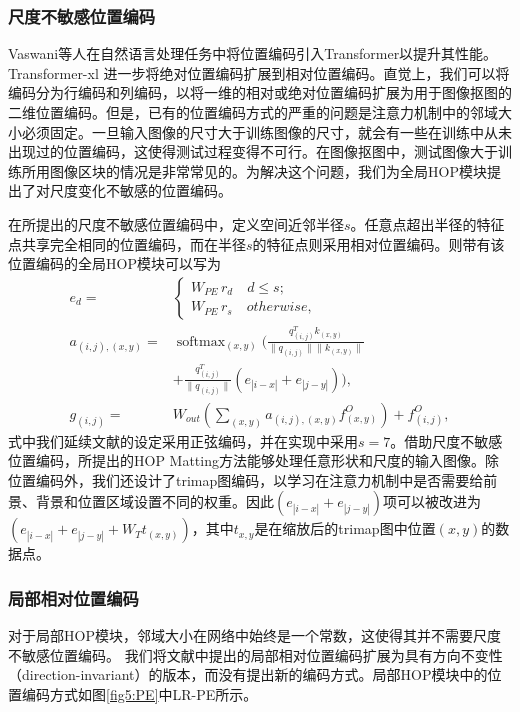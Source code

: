 \subsubsection{尺度不敏感位置编码}
Vaswani等人\cite{vaswani2017attention}在自然语言处理任务中将位置编码引入Transformer以提升其性能。Transformer-xl \cite{dai2019transformer} 进一步将绝对位置编码扩展到相对位置编码。直觉上，我们可以将编码分为行编码和列编码，以将一维的相对或绝对位置编码扩展为用于图像抠图的二维位置编码。但是，已有的位置编码方式的严重的问题是注意力机制中的邻域大小必须固定。一旦输入图像的尺寸大于训练图像的尺寸，就会有一些在训练中从未出现过的位置编码，这使得测试过程变得不可行。在图像抠图中，测试图像大于训练所用图像区块的情况是非常常见的。为解决这个问题，我们为全局HOP模块提出了对尺度变化不敏感的位置编码。

在所提出的尺度不敏感位置编码中，定义空间近邻半径$s$。任意点超出半径的特征点共享完全相同的位置编码，而在半径$s$的特征点则采用相对位置编码。则带有该位置编码的全局HOP模块可以写为
\begin{equation}
\begin{aligned}
e_d =& \begin{cases} W_{PE}\,r_d  \quad d\le s;\\ W_{PE}\,r_s   \quad otherwise,\end{cases} \\
a_{(i,j),(x,y)} =& \mathop{\mathrm{softmax}}_{(x,y)}(\frac{q_{(i,j)}^Tk_{(x,y)}}{\|q_{(i,j)}\|\|k_{(x,y)}\|}\\ & + \frac{q_{(i,j)}^T}{\|q_{(i,j)}\|}(e_{|i-x|}+e_{|j-y|})),\\
g_{(i,j)} =& W_{out}(\sum_{(x,y)}a_{(i,j),(x,y)}f^O_{(x,y)}) + f^O_{(i,j)},
\end{aligned}
\end{equation}
式中我们延续文献\parencite{vaswani2017attention,dai2019transformer}的设定采用正弦编码，并在实现中采用$s=7$。借助尺度不敏感位置编码，所提出的HOP Matting方法能够处理任意形状和尺度的输入图像。除位置编码外，我们还设计了trimap图编码，以学习在注意力机制中是否需要给前景、背景和位置区域设置不同的权重。因此$(e_{|i-x|}+e_{|j-y|})$项可以被改进为$(e_{|i-x|}+e_{|j-y|}+W_{T}t_{(x,y)})$，其中$t_{x,y}$是在缩放后的trimap图中位置$(x,y)$的数据点。

\subsubsection{局部相对位置编码}
对于局部HOP模块，邻域大小在网络中始终是一个常数，这使得其并不需要尺度不敏感位置编码。
我们将文献\parencite{ramachandran2019stand}中提出的局部相对位置编码扩展为具有方向不变性（direction-invariant）的版本，而没有提出新的编码方式。局部HOP模块中的位置编码方式如图\ref{fig5:PE}中LR-PE所示。

